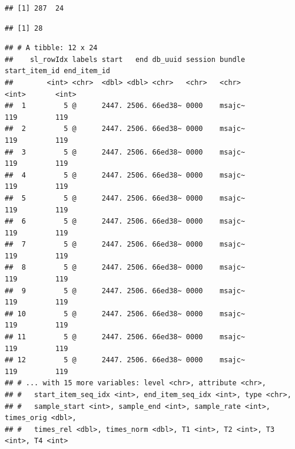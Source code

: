 \documentclass[]{book}
\newenvironment{Shaded}{\begin{snugshade}}{\end{snugshade}}
\newcommand{\CommentTok}[1]{\textcolor[rgb]{0.56,0.35,0.01}{\textit{#1}}}
\newcommand{\DecValTok}[1]{\textcolor[rgb]{0.00,0.00,0.81}{#1}}
\newcommand{\KeywordTok}[1]{\textcolor[rgb]{0.13,0.29,0.53}{\textbf{#1}}}
\newcommand{\NormalTok}[1]{#1}
\newcommand{\OperatorTok}[1]{\textcolor[rgb]{0.81,0.36,0.00}{\textbf{#1}}}
\newcommand{\StringTok}[1]{\textcolor[rgb]{0.31,0.60,0.02}{#1}}
\begin{document}
\begin{verbatim}
## [1] 287  24
\end{verbatim}

\begin{Shaded}
\end{Shaded}

\begin{verbatim}
## [1] 28
\end{verbatim}

\begin{Shaded}
\end{Shaded}

\begin{verbatim}
## # A tibble: 12 x 24
##    sl_rowIdx labels start   end db_uuid session bundle start_item_id end_item_id
##        <int> <chr>  <dbl> <dbl> <chr>   <chr>   <chr>          <int>       <int>
##  1         5 @      2447. 2506. 66ed38~ 0000    msajc~           119         119
##  2         5 @      2447. 2506. 66ed38~ 0000    msajc~           119         119
##  3         5 @      2447. 2506. 66ed38~ 0000    msajc~           119         119
##  4         5 @      2447. 2506. 66ed38~ 0000    msajc~           119         119
##  5         5 @      2447. 2506. 66ed38~ 0000    msajc~           119         119
##  6         5 @      2447. 2506. 66ed38~ 0000    msajc~           119         119
##  7         5 @      2447. 2506. 66ed38~ 0000    msajc~           119         119
##  8         5 @      2447. 2506. 66ed38~ 0000    msajc~           119         119
##  9         5 @      2447. 2506. 66ed38~ 0000    msajc~           119         119
## 10         5 @      2447. 2506. 66ed38~ 0000    msajc~           119         119
## 11         5 @      2447. 2506. 66ed38~ 0000    msajc~           119         119
## 12         5 @      2447. 2506. 66ed38~ 0000    msajc~           119         119
## # ... with 15 more variables: level <chr>, attribute <chr>,
## #   start_item_seq_idx <int>, end_item_seq_idx <int>, type <chr>,
## #   sample_start <int>, sample_end <int>, sample_rate <int>, times_orig <dbl>,
## #   times_rel <dbl>, times_norm <dbl>, T1 <int>, T2 <int>, T3 <int>, T4 <int>
\end{verbatim}
\end{document}
